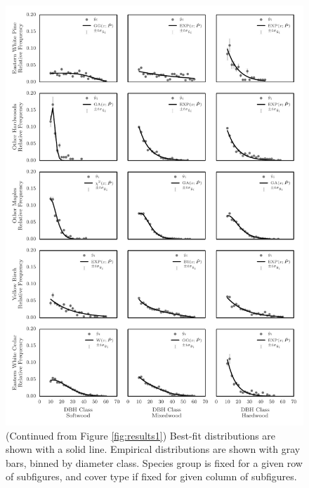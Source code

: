 \message{ !name(pspdistfit_article.tex)}\documentclass{article}
\begin{document}
\begin{figure}[h!]%
  \centering
  \includegraphics[width=1.0\textwidth]{images/pspdistfit_fitplot1}
  \caption{(Continued from Figure \ref{fig:results1}) Best-fit distributions are shown with a solid
    line. Empirical distributions are shown with gray bars, binned by
    diameter class. Species group is fixed for a given row of
    subfigures, and cover type if fixed for given column of subfigures.}
  \label{fig:results2}
\end{figure}
\end{document}
